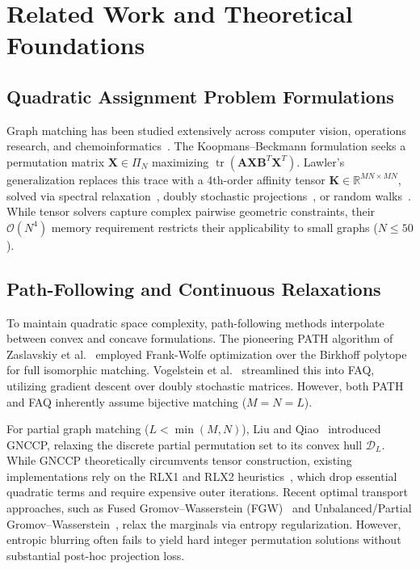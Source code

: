 \documentclass[a4paper,fleqn]{cas-dc}
\theoremstyle{thmstyleone}
\theoremstyle{thmstyletwo}
\theoremstyle{thmstylethree}
\begin{document}
\section{Related Work and Theoretical Foundations}
\label{sec:related}

\subsection{Quadratic Assignment Problem Formulations}
Graph matching has been studied extensively across computer vision, operations research, and chemoinformatics~\cite{loiola2007, gold1996, zaslavskiy2009}. The Koopmans--Beckmann formulation seeks a permutation matrix $\mathbf{X} \in \Pi_N$ maximizing $\operatorname{tr}(\mathbf{A}\mathbf{X}\mathbf{B}^T\mathbf{X}^T)$. Lawler's generalization replaces this trace with a 4th-order affinity tensor $\mathbf{K} \in \mathbb{R}^{MN \times MN}$, solved via spectral relaxation~\cite{leordeanu2005}, doubly stochastic projections~\cite{gold1996}, or random walks~\cite{cho2010rrwm}. While tensor solvers capture complex pairwise geometric constraints, their $\mathcal{O}(N^4)$ memory requirement restricts their applicability to small graphs ($N \le 50$).

\subsection{Path-Following and Continuous Relaxations}
To maintain quadratic space complexity, path-following methods interpolate between convex and concave formulations. The pioneering PATH algorithm of Zaslavskiy et al.~\cite{zaslavskiy2009} employed Frank-Wolfe optimization over the Birkhoff polytope for full isomorphic matching. Vogelstein et al.~\cite{vogelstein2015fast} streamlined this into FAQ, utilizing gradient descent over doubly stochastic matrices. However, both PATH and FAQ inherently assume bijective matching ($M = N = L$).

For partial graph matching ($L < \min(M, N)$), Liu and Qiao~\cite{liu2015graduated, yang2018algorithm} introduced GNCCP, relaxing the discrete partial permutation set to its convex hull $\mathcal{D}_L$. While GNCCP theoretically circumvents tensor construction, existing implementations rely on the RLX1 and RLX2 heuristics~\cite{yang2018algorithm}, which drop essential quadratic terms and require expensive outer iterations. Recent optimal transport approaches, such as Fused Gromov--Wasserstein (FGW)~\cite{titouan2019optimal} and Unbalanced/Partial Gromov--Wasserstein~\cite{chapel2020partial}, relax the marginals via entropy regularization. However, entropic blurring often fails to yield hard integer permutation solutions without substantial post-hoc projection loss.
\end{document}
